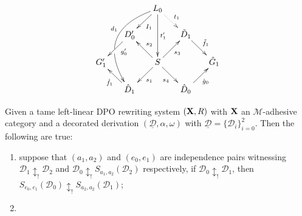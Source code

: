 \documentclass[a4paper,UKenglish,cleveref,pdftex, thm-restate,numberwithinsect]{lipics}
\def\R{\mathsf{R}}
\def\X{\textbf {\textup{X}}}
\newcommand{\dder}[1]{\mathscr{#1}}
\newcommand{\der}[1]{\underline{\dder{#1}}}
\begin{document}
\[\xymatrix@R=15pt@C=15pt{&&L_ 0\ar[dl]^{I_1} \ar@/_1.2cm/[dddl]_(.4){d_1}|(.63)\hole\ar[dd]^{t'_1} \ar@{.>}[dr]^{t_1}\\&D'_0 \ar[dl]^(.4){g'_0}&&\tilde{D}_1 \ar[dr]^{\tilde{f}_1}\\G'_1 && S\ar[dr]_{s_4} \ar[ur]_{s_3}\ar[dl]^{s_1} \ar[ul]_{s_2}&&\hat{G}_1\\& \hat{D}_1 \ar[ul]^{\hat{f}_1}&&\hat{D}_0 \ar[ur]_{\hat{g}_0}}\]






\newpage 
\iffalse 
\begin{corollary} Given a tame  left-linear DPO rewriting system  $(\X,\R)$ with $\X$ an $\mathcal{M}$-adhesive category and a decorated derivation $(\der{D}, \alpha, \omega)$ with $\der{D}=\{\dder{D}_i\}_{i=0}^2$. Then the following are true: 
	\begin{enumerate}
		\item suppose that $(a_1,a_2)$ and $(e_0,e_1)$ are independence pairs witnessing  $\dder{D}_1\updownarrow_! \dder{D}_2$ and $\dder{D}_0\updownarrow_! S_{a_1,a_2}(\dder{D}_2)$ respectively, if $\dder{D}_0\updownarrow_!\dder{D}_1$, then $S_{e_0,e_1}(\dder{D}_0)\updownarrow_!S_{a_2,a_2}(\dder{D}_1)$;
		\item 
	\end{enumerate}
\end{corollary}
\end{document}
